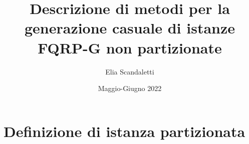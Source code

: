 \documentclass{article}
\title{Descrizione di metodi per la generazione casuale di istanze FQRP-G non partizionate}
\author{Elia Scandaletti}
\date{Maggio-Giugno 2022}
\theoremstyle{definition}
\begin{document}
\maketitle

\tableofcontents

\section{Definizione di istanza partizionata}

\end{document}
